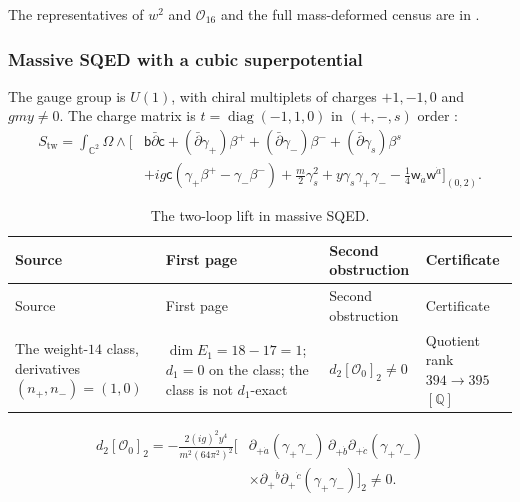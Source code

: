 \documentclass[11pt]{article}
\numberwithin{equation}{section}
\numberwithin{figure}{section}
\numberwithin{table}{section}
\begin{document}
The representatives of $w^2$ and $\mathcal O_{16}$ and the full mass-deformed census are in \cite[supplement, Sections S7.2 and S8.4]{Repo}.

\subsubsection{Massive SQED with a cubic superpotential}\label{sec-results-SQED}

The gauge group is $U(1)$, with chiral multiplets of charges $+1,-1,0$ and $gmy\ne0$. The charge matrix is $t=\operatorname{diag}(-1,1,0)$ in $(+,-,s)$ order \cite[results report, \S5.4]{Repo}:
\begin{equation}\label{local-ch9-sqed-action}
\begin{aligned}
S_{\mathrm{tw}}=\int_{\mathbb C^2}\Omega\wedge\Big[
&\mathsf b\bar\partial\mathsf c
+(\bar\partial\gamma_+)\beta^+
+(\bar\partial\gamma_-)\beta^-
+(\bar\partial\gamma_s)\beta^s\\
&+ig\mathsf c(\gamma_+\beta^+-\gamma_-\beta^-)
+\frac m2\gamma_s^2+y\gamma_s\gamma_+\gamma_-
-\frac14\mathsf w_{\dot a}\mathsf w^{\dot a}\Big]_{(0,2)}.
\end{aligned}
\end{equation}

{\footnotesize\renewcommand{\arraystretch}{1.3}\setlength{\tabcolsep}{3.5pt}
\begin{xltabular}{\linewidth}{|>{\raggedright\arraybackslash}X|>{\raggedright\arraybackslash}X|>{\raggedright\arraybackslash}X|>{\raggedright\arraybackslash}X|}
\caption{The two-loop lift in massive SQED.}\label{local-ch9-sqed-results}\\
\hline
Source & First page & Second obstruction & Certificate\\
\hline\endfirsthead
\hline
Source & First page & Second obstruction & Certificate\\
\hline\endhead
The weight-$14$ class, derivatives $(n_+,n_-)=(1,0)$ & $\dim E_1=18-17=1$; $d_1=0$ on the class; the class is not $d_1$-exact & $d_2[\mathcal O_0]_2\ne0$ & Quotient rank $394\to395$ $[\mathbb Q]$\\
\hline
\end{xltabular}}

\begin{equation}\label{local-ch9-sqed-lift}
\begin{aligned}
d_2[\mathcal O_0]_2
=-\frac{2(ig)^2y^4}{m^2(64\pi^2)^2}\Big[
&\partial_{+\dot a}(\gamma_+\gamma_-)
\,\partial_{+\dot b}\partial_{+\dot c}(\gamma_+\gamma_-)\\
&\times\partial_+{}^{\dot b}\partial_+{}^{\dot c}(\gamma_+\gamma_-)
\Big]_2\ne0.
\end{aligned}
\end{equation}
\end{document}
